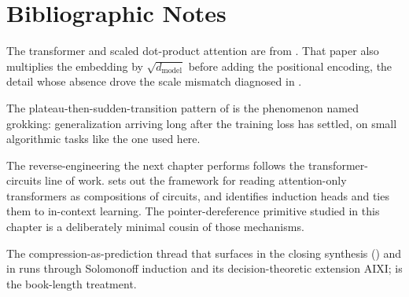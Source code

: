 
\section*{Bibliographic Notes}

The transformer and scaled dot-product attention are from
\textcite{vaswani2017attention}. That paper also multiplies the embedding
by $\sqrt{d_{\text{model}}}$ before adding the positional encoding, the
detail whose absence drove the scale mismatch diagnosed in
.

The plateau-then-sudden-transition pattern of 
is the phenomenon \textcite{power2022grokking} named grokking:
generalization arriving long after the training loss has settled, on
small algorithmic tasks like the one used here.

The reverse-engineering the next chapter performs follows the
transformer-circuits line of work. \textcite{elhage2021framework} sets out
the framework for reading attention-only transformers as compositions of
circuits, and \textcite{olsson2022induction} identifies induction heads
and ties them to in-context learning. The pointer-dereference primitive
studied in this chapter is a deliberately minimal cousin of those
mechanisms.

The compression-as-prediction thread that surfaces in the closing
synthesis () and in  runs
through Solomonoff induction and its decision-theoretic extension AIXI;
\textcite{hutter2005uai} is the book-length treatment.
